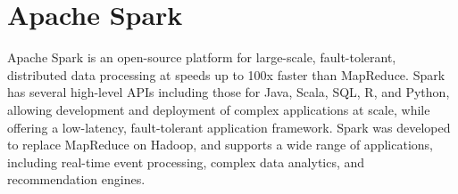 \section{Apache Spark}

Apache Spark is an open-source platform for large-scale, fault-tolerant, 
distributed data processing at speeds up to 100x faster than MapReduce. \cite{hid-sp18-407-spark-Aven}
Spark has several high-level APIs including those for 
Java, Scala, SQL, R, and Python, allowing development and deployment of 
complex applications at scale, while offering a low-latency, fault-tolerant 
application framework. \cite{hid-sp18-407-spark-Aven}
Spark was developed to replace MapReduce on Hadoop, and 
supports a wide range of applications, including real-time event processing, 
complex data analytics, and recommendation engines.  \cite{hid-sp18-407-sparkhadoop}
